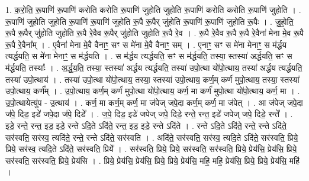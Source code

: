 \documentclass[17pt]{extarticle}
\begin{document}
1. क॒रो॒ति॒ रू॒पाणि॑ रू॒पाणि॑ करोति करोति रू॒पाणि॑ जुहोति जुहोति रू॒पाणि॑ करोति करोति रू॒पाणि॑ जुहोति । . रू॒पाणि॑ जुहोति जुहोति रू॒पाणि॑ रू॒पाणि॑ जुहोति रू॒पै रू॒पैर् जु॑होति रू॒पाणि॑ रू॒पाणि॑ जुहोति रू॒पैः । . जु॒हो॒ति॒ रू॒पै रू॒पैर् जु॑होति जुहोति रू॒पै रे॒वैव रू॒पैर् जु॑होति जुहोति रू॒पै रे॒व । . रू॒पै रे॒वैव रू॒पै रू॒पै रे॒वैना॑ मेना मे॒व रू॒पै रू॒पै रे॒वैना᳚म् । . ए॒वैना॑ मेना मे॒वै वैनाꣳ॒॒ सꣳ स मे॑ना मे॒वै वैनाꣳ॒॒ सम् । . ए॒नाꣳ॒॒ सꣳ स मे॑ना मेनाꣳ॒॒ स म॑र्द्धय त्यर्द्धयति॒ स मे॑ना मेनाꣳ॒॒ स म॑र्द्धयति । . स म॑र्द्धय त्यर्द्धयति॒ सꣳ स म॑र्द्धयति॒ तस्या॒ स्तस्या॑ अर्द्धयति॒ सꣳ स म॑र्द्धयति॒ तस्याः᳚ । . अ॒र्द्ध॒य॒ति॒ तस्या॒ स्तस्या॑ अर्द्धय त्यर्द्धयति॒ तस्या॑ उपो॒त्था यो॑पो॒त्थाय॒ तस्या॑ अर्द्धय त्यर्द्धयति॒ तस्या॑ उपो॒त्थाय॑ । . तस्या॑ उपो॒त्था यो॑पो॒त्थाय॒ तस्या॒ स्तस्या॑ उपो॒त्थाय॒ कर्ण॒म् कर्ण॑ मुपो॒त्थाय॒ तस्या॒ स्तस्या॑ उपो॒त्थाय॒ कर्ण᳚म् । . उ॒पो॒त्थाय॒ कर्ण॒म् कर्ण॑ मुपो॒त्था यो॑पो॒त्थाय॒ कर्ण॒ मा कर्ण॑ मुपो॒त्था यो॑पो॒त्थाय॒ कर्ण॒ मा । . उ॒पो॒त्थायेत्यु॑प - उ॒त्थाय॑ । . कर्ण॒ मा कर्ण॒म् कर्ण॒ मा ज॑पेज् जपे॒दा कर्ण॒म् कर्ण॒ मा ज॑पेत् । . आ ज॑पेज् जपे॒दा ज॑पे॒ दिड॒ इडे॑ जपे॒दा ज॑पे॒ दिडे᳚ । . ज॒पे॒ दिड॒ इडे॑ जपेज् जपे॒ दिडे॒ रन्ते॒ रन्त॒ इडे॑ जपेज् जपे॒ दिडे॒ रन्ते᳚ । . इडे॒ रन्ते॒ रन्त॒ इड॒ इडे॒ रन्ते ऽदि॒ते ऽदि॑ते॒ रन्त॒ इड॒ इडे॒ रन्ते ऽदि॑ते । . रन्ते ऽदि॒ते ऽदि॑ते॒ रन्ते॒ रन्ते ऽदि॑ते॒ सर॑स्वति॒ सर॑स्व॒ त्यदि॑ते॒ रन्ते॒ रन्ते ऽदि॑ते॒ सर॑स्वति । . अदि॑ते॒ सर॑स्वति॒ सर॑स्व॒ त्यदि॒ते ऽदि॑ते॒ सर॑स्वति॒ प्रिये॒ प्रिये॒ सर॑स्व॒ त्यदि॒ते ऽदि॑ते॒ सर॑स्वति॒ प्रिये᳚ । . सर॑स्वति॒ प्रिये॒ प्रिये॒ सर॑स्वति॒ सर॑स्वति॒ प्रिये॒ प्रेय॑सि॒ प्रेय॑सि॒ प्रिये॒ सर॑स्वति॒ सर॑स्वति॒ प्रिये॒ प्रेय॑सि । . प्रिये॒ प्रेय॑सि॒ प्रेय॑सि॒ प्रिये॒ प्रिये॒ प्रेय॑सि॒ महि॒ महि॒ प्रेय॑सि॒ प्रिये॒ प्रिये॒ प्रेय॑सि॒ महि॑ । \newline
\end{document}
